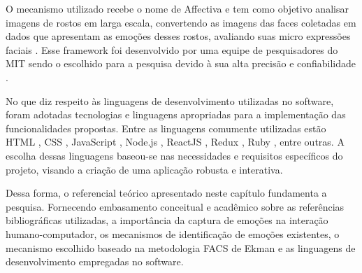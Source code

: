 O mecanismo utilizado recebe o nome de Affectiva \cite{8} e tem como objetivo analisar imagens de rostos em larga escala, convertendo as imagens das faces coletadas em dados que apresentam as emoções desses rostos, avaliando suas micro expressões faciais \cite{4}. Esse framework foi desenvolvido por uma equipe de pesquisadores do MIT \cite{8} sendo o escolhido para a pesquisa devido à sua alta precisão e confiabilidade \cite{9}\cite{10}.

No que diz respeito às linguagens de desenvolvimento utilizadas no software, foram adotadas tecnologias e linguagens apropriadas para a implementação das funcionalidades propostas. Entre as linguagens comumente utilizadas estão HTML \cite{11}, CSS \cite{12}, JavaScript \cite{13}, Node.js \cite{14}, ReactJS \cite{15}, Redux \cite{16}, Ruby \cite{17}, entre outras. A escolha dessas linguagens baseou-se nas necessidades e requisitos específicos do projeto, visando a criação de uma aplicação robusta e interativa.

Dessa forma, o referencial teórico apresentado neste capítulo fundamenta a pesquisa. Fornecendo embasamento conceitual e acadêmico sobre as referências bibliográficas utilizadas, a importância da captura de emoções na interação humano-computador, os mecanismos de identificação de emoções existentes, o mecanismo escolhido baseado na metodologia FACS de Ekman \cite{5} e as linguagens de desenvolvimento empregadas no software.
